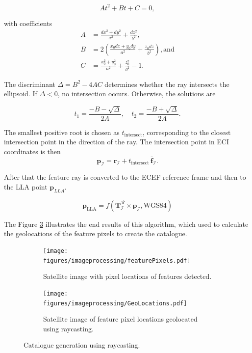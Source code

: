 \begin{equation}
    A t^2 + B t + C = 0,
\end{equation}

\noindent
with coefficients
\begin{align*}
    A &= \frac{dx^2 + dy^2}{a^2} + \frac{dz^2}{b^2}, \\
    B &= 2 \left( \frac{x_0 dx + y_0 dy}{a^2} + \frac{z_0 dz}{b^2} \right), \text{and} \\
    C &= \frac{x_0^2 + y_0^2}{a^2} + \frac{z_0^2}{b^2} - 1.
\end{align*}

\noindent
The discriminant $\Delta = B^2 - 4AC$ determines whether the ray intersects the ellipsoid. If $\Delta < 0$, no intersection occurs. Otherwise, the solutions are

\begin{equation}
    t_1 = \frac{-B - \sqrt{\Delta}}{2A}, \quad
    t_2 = \frac{-B + \sqrt{\Delta}}{2A}.
\end{equation}

\noindent
The smallest positive root is chosen as $t_\text{intersect}$, corresponding to the closest intersection point in the direction of the ray. 
The intersection point in ECI coordinates is then
\begin{equation}
    \mathbf{p}_\mathcal{I} = \mathbf{r}_\mathcal{I} + t_\text{intersect} \, \bar{\mathbf{f}}_\mathcal{I}.
\end{equation}

\noindent
After that the feature ray is converted to the ECEF reference frame and then to the LLA point $\mathbf{p}_{LLA}$.

\begin{equation}
    \mathbf{p}_\text{LLA} = f(\mathbf{T}_\mathcal{I}^\mathcal{R} \times \mathbf{p}_\mathcal{I},\text{WGS84})
\end{equation}

\noindent
The Figure \ref{fig:GL} illustrates the end results  of this algorithm, which used to calculate the geolocations of the feature pixels to create the catalogue.

\begin{figure}[H]
    \centering
    \begin{subfigure}[b]{0.45\linewidth}
        \centering
        \texttt{[image: figures/imageprocessing/featurePixels.pdf]}
        \caption{Satellite image with pixel locations of features detected.}
        \label{fig:PL}
    \end{subfigure}
    \hfill
    \begin{subfigure}[b]{0.48\linewidth}
        \centering
        \texttt{[image: figures/imageprocessing/GeoLocations.pdf]}
        \caption{Satellite image of feature pixel locations geolocated using raycasting.}
        \label{fig:RC}
    \end{subfigure}
    \caption{Catalogue generation using raycasting.}
    \label{fig:GL}
\end{figure}

